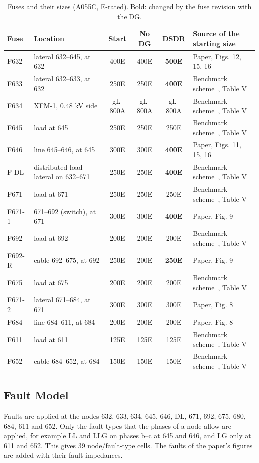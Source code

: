 \documentclass[12pt,letterpaper]{article}
\newcommand{\hd}{\rowcolor{headc}}
\begin{document}
\begin{table}[H]
\centering\footnotesize
\begin{tabularx}{\textwidth}{@{}llcccL@{}}
\toprule
\hd\textbf{Fuse} & \textbf{Location} & \textbf{Start} & \textbf{No DG} & \textbf{DSDR} & \textbf{Source of the starting size} \\
\midrule
F632 & lateral 632--645, at 632 & 400E & 400E & \textbf{500E} & Paper, Figs. 12, 15, 16 \\
F633 & lateral 632--633, at 632 & 250E & 250E & \textbf{400E} & Benchmark scheme~\cite{yousaf2020}, Table V \\
F634 & XFM-1, 0.48 kV side & gL-800A & gL-800A & gL-800A & Benchmark scheme~\cite{yousaf2020}, Table V \\
F645 & load at 645 & 250E & 250E & 250E & Benchmark scheme~\cite{yousaf2020}, Table V \\
F646 & line 645--646, at 645 & 300E & 300E & \textbf{400E} & Paper, Figs. 11, 15, 16 \\
F-DL & distributed-load lateral on 632--671 & 250E & 250E & \textbf{400E} & Benchmark scheme~\cite{yousaf2020}, Table V \\
F671 & load at 671 & 250E & 250E & 250E & Benchmark scheme~\cite{yousaf2020}, Table V \\
F671-1 & 671--692 (switch), at 671 & 300E & 300E & \textbf{400E} & Paper, Fig. 9 \\
F692 & load at 692 & 200E & 200E & 200E & Benchmark scheme~\cite{yousaf2020}, Table V \\
F692-R & cable 692--675, at 692 & 250E & 200E & \textbf{250E} & Paper, Fig. 9 \\
F675 & load at 675 & 200E & 200E & 200E & Benchmark scheme~\cite{yousaf2020}, Table V \\
F671-2 & lateral 671--684, at 671 & 300E & 300E & 300E & Paper, Fig. 8 \\
F684 & line 684--611, at 684 & 200E & 200E & 200E & Paper, Fig. 8 \\
F611 & load at 611 & 125E & 125E & 125E & Benchmark scheme~\cite{yousaf2020}, Table V \\
F652 & cable 684--652, at 684 & 150E & 150E & 150E & Benchmark scheme~\cite{yousaf2020}, Table V \\
\bottomrule
\end{tabularx}
\caption{Fuses and their sizes (A055C, E-rated). Bold: changed by the fuse revision with the DG.}
\label{tab:fuses}
\end{table}

\subsection{Fault Model}
Faults are applied at the nodes 632, 633, 634, 645, 646, DL, 671, 692, 675, 680, 684, 611 and 652. Only the
fault types that the phases of a node allow are applied, for example LL and LLG on phases b--c at 645 and
646, and LG only at 611 and 652. This gives 39 node/fault-type cells. The faults of the paper's
figures are added with their fault impedances.
\end{document}
